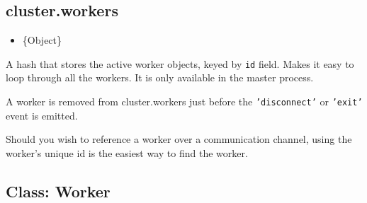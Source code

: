 \subsection{cluster.workers}\label{cluster.workers}

\begin{itemize}
\itemsep1pt\parskip0pt
\item
  \{Object\}
\end{itemize}

A hash that stores the active worker objects, keyed by \texttt{id}
field. Makes it easy to loop through all the workers. It is only
available in the master process.

A worker is removed from cluster.workers just before the
\texttt{'disconnect'} or \texttt{'exit'} event is emitted.

\begin{Shaded}
\begin{Highlighting}[]
 
   \NormalTok{(}  \NormalTok{) \{}
    \NormalTok{(}\NormalTok{[id]);}
  \NormalTok{\}}
\NormalTok{\}}
\NormalTok{(}
  \NormalTok{(}\NormalTok{);}
\NormalTok{\});}
\end{Highlighting}
\end{Shaded}

Should you wish to reference a worker over a communication channel,
using the worker's unique id is the easiest way to find the worker.

\begin{Shaded}
\begin{Highlighting}[]
\NormalTok{(}\NormalTok{, }
   \NormalTok{[id];}
\NormalTok{\});}
\end{Highlighting}
\end{Shaded}

\subsection{Class: Worker}\label{class-worker}

